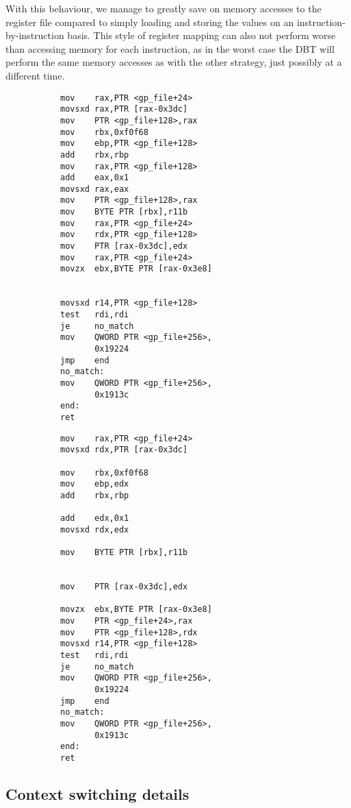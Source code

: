 With this behaviour, we manage to greatly save on memory accesses to the register file compared to simply loading and storing the values on an instruction-by-instruction basis.
This style of register mapping can also not perform worse than accessing memory for each instruction, as in the worst case the DBT will perform the same memory accesses as with the other strategy, just possibly at a different time.
\begin{figure}[h]
\begin{subfigure}{0.45\textwidth}
\begin{lstlisting}[label={lst:lstlisting}]
mov    rax,PTR <gp_file+24>
movsxd rax,PTR [rax-0x3dc]
mov    PTR <gp_file+128>,rax
mov    rbx,0xf0f68
mov    ebp,PTR <gp_file+128>
add    rbx,rbp
mov    rax,PTR <gp_file+128>
add    eax,0x1
movsxd rax,eax
mov    PTR <gp_file+128>,rax
mov    BYTE PTR [rbx],r11b
mov    rax,PTR <gp_file+24>
mov    rdx,PTR <gp_file+128>
mov    PTR [rax-0x3dc],edx
mov    rax,PTR <gp_file+24>
movzx  ebx,BYTE PTR [rax-0x3e8]


movsxd r14,PTR <gp_file+128>
test   rdi,rdi
je     no_match
mov    QWORD PTR <gp_file+256>,
       0x19224
jmp    end
no_match:
mov    QWORD PTR <gp_file+256>,
       0x1913c
end:
ret
\end{lstlisting}
\end{subfigure}
\hfill
\begin{subfigure}{0.45\textwidth}
\begin{lstlisting}[label={lst:lstlisting}]
mov    rax,PTR <gp_file+24>
movsxd rdx,PTR [rax-0x3dc]

mov    rbx,0xf0f68
mov    ebp,edx
add    rbx,rbp

add    edx,0x1
movsxd rdx,edx

mov    BYTE PTR [rbx],r11b


mov    PTR [rax-0x3dc],edx

movzx  ebx,BYTE PTR [rax-0x3e8]
mov    PTR <gp_file+24>,rax
mov    PTR <gp_file+128>,rdx
movsxd r14,PTR <gp_file+128>
test   rdi,rdi
je     no_match
mov    QWORD PTR <gp_file+256>,
       0x19224
jmp    end
no_match:
mov    QWORD PTR <gp_file+256>,
       0x1913c
end:
ret
\end{lstlisting}
\end{subfigure}
\label{fig:figure2}
\end{figure}


\subsection{Context switching details}

